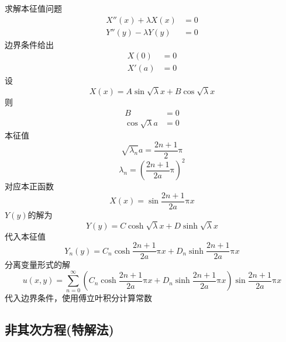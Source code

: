 \documentclass{article}
\begin{document}
求解本征值问题
\begin{equation*}
  \begin{aligned}
    X''(x) + \lambda X(x) &= 0\\
    Y''(y) - \lambda Y(y) &= 0
  \end{aligned}
\end{equation*}
边界条件给出
\begin{equation*}
  \begin{aligned}
    X(0) &=  0\\
    X'(a) &= 0
  \end{aligned}
\end{equation*}
设
\begin{equation*}
  X(x) = A \sin \sqrt{\lambda} x + B \cos \sqrt{\lambda} x
\end{equation*}
则
\begin{equation*}
  \begin{aligned}
    B &= 0\\
    \cos \sqrt{\lambda} a &= 0
  \end{aligned}
\end{equation*}
本征值
\begin{equation*}
  \sqrt{\lambda_{n}} a = \dfrac{2n+1}{2} \mathrm{\pi}
\end{equation*}
\begin{equation*}
  \lambda_{n} = \left( \dfrac{2n+1}{2a} \mathrm{\pi} \right)^{2}
\end{equation*}
对应本正函数
\begin{equation*}
  X(x) = \sin  \dfrac{2n+1}{2a} \mathrm{\pi}  x
\end{equation*}
$Y(y)$的解为
\begin{equation*}
  Y(y) = C \cosh \sqrt{\lambda}x + D \sinh \sqrt{\lambda} x
\end{equation*}
代入本征值
\begin{equation*}
  Y_{n}(y) = C_{n} \cosh \dfrac{2n+1}{2a} \mathrm{\pi} x + D_{n} \sinh \dfrac{2n+1}{2a} \mathrm{\pi} x
\end{equation*}
分离变量形式的解
\begin{equation*}
  u(x,y) = \sum\limits_{n=0}^{\infty} \left( C_{n} \cosh \dfrac{2n+1}{2a} \mathrm{\pi} x + D_{n} \sinh \dfrac{2n+1}{2a} \mathrm{\pi} x \right)\sin  \dfrac{2n+1}{2a} \mathrm{\pi}  x
\end{equation*}
代入边界条件，使用傅立叶积分计算常数


\subsection{非其次方程(特解法)}
\end{document}
